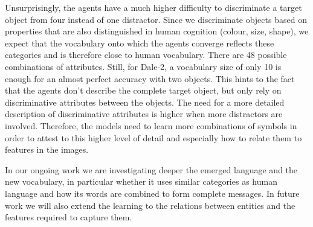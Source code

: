 \documentclass[11pt]{article}
\begin{document}
Unsurprisingly, the agents have a much higher difficulty to discriminate a target object from four instead of one distractor.
Since we discriminate objects based on properties that are also distinguished in human cognition (colour, size, shape), we expect that the vocabulary onto which the agents converge reflects these categories and is therefore close to human vocabulary.
There are 48 possible combinations of attributes.
Still, for Dale-2, a vocabulary size of only 10 is enough for an almost perfect accuracy with two objects.
This hints to the fact that the agents don't describe the complete target object, but only rely on discriminative attributes between the objects.
The need for a more detailed description of discriminative attributes is higher when more distractors are involved.
Therefore, the models need to learn more combinations of symbols in order to attest to this higher level of detail and especially how to relate them to features in the images.


In our ongoing work we are investigating deeper the emerged language and the new vocabulary,
in particular whether
it uses similar categories as human language and how its words are combined to form complete messages.
In future work we will also extend the learning to the relations between entities and the features required to capture them.

\end{document}
